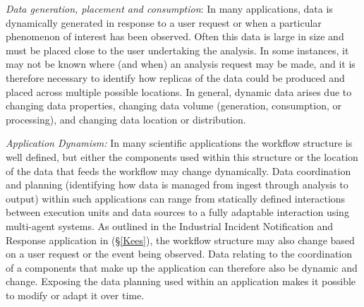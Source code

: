 
\emph{Data generation, placement and consumption}: In many
applications, data is dynamically generated in response to a user
request or when a particular phenomenon of interest has been
observed. Often this data is large in size and must be placed close to
the user undertaking the analysis. In some instances, it may not be
known where (and when) an analysis request may be made, and it is
therefore necessary to identify how replicas of the data could be
produced and placed across multiple possible locations.  In general,
dynamic data arises due to changing data properties, changing data
volume (generation, consumption, or processing), and changing data
location or distribution.



\emph{Application Dynamism: } In many scientific applications the
workflow structure is well defined, but either the components used
within this structure or the location of the data that feeds the
workflow may change dynamically.  Data coordination and planning
(identifying how data is managed from ingest through analysis to
output) within such applications can range from statically defined
interactions between execution units and data sources to a fully
adaptable interaction using multi-agent systems.  As outlined in the
Industrial Incident Notification and Response application in
(\S\ref{Kees}), the workflow structure may also change based on a user
request or the event being observed. Data relating to the coordination
of a components that make up the application can therefore also be
dynamic and change.  Exposing the data planning used within an
application makes it possible to modify or adapt it over time.


